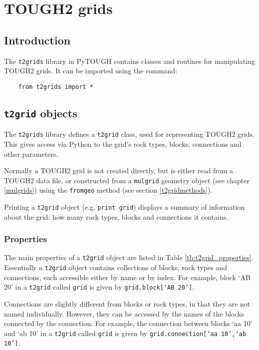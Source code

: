 \chapter{TOUGH2 grids}
\label{t2grids}

\section{Introduction}
The \texttt{t2grids} library in PyTOUGH contains classes and routines for manipulating TOUGH2 grids.  It can be imported using the command:

\begin{verbatim}
    from t2grids import *
\end{verbatim}

\section{\texttt{t2grid} objects}

The \texttt{t2grids} library defines a \texttt{t2grid} class, used for representing TOUGH2 grids.  This gives access via Python to the grid's rock types, blocks, connections and other parameters.

Normally a TOUGH2 grid is not created directly, but is either read from a TOUGH2 data file, or constructed from a \texttt{mulgrid} geometry object (see chapter \ref{mulgrids}) using the \texttt{fromgeo} method (see section \ref{t2gridmethods}).

Printing a \texttt{t2grid} object (e.g. \texttt{print grid}) displays a summary of information about the grid: how many rock types, blocks and connections it contains.

\subsection{Properties}

The main properties of a \texttt{t2grid} object are listed in Table \ref{tb:t2grid_properties}.  Essentially a \texttt{t2grid} object contains collections of blocks, rock types and connections, each accessible either by name or by index.  For example, block `AB 20' in a \texttt{t2grid} called \texttt{grid} is given by \texttt{grid.block[`AB 20']}.

Connections are slightly different from blocks or rock types, in that they are not named individually.  However, they can be accessed by the names of the blocks connected by the connection.  For example, the connection between blocks `aa 10' and `ab 10' in a \texttt{t2grid} called \texttt{grid} is given by \texttt{grid.connection[`aa 10',`ab 10']}.


